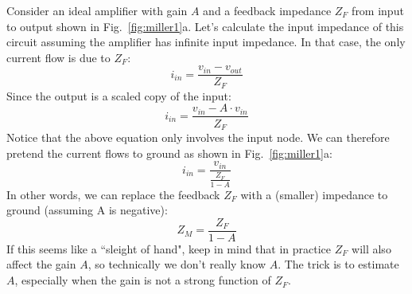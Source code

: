 Consider an ideal amplifier with gain $A$ and a feedback impedance $Z_F$ from input to output shown in Fig.~\ref{fig:miller1}a.  Let's calculate the input impedance of this circuit assuming the amplifier has infinite input impedance.  In that case, the only current flow is due to $Z_F$:
\begin{equation}
	i_{in} = \frac{v_{in} - v_{out}}{Z_F}
\end{equation}
Since the output is a scaled copy of the input:
\begin{equation}
	i_{in} = \frac{ v_{in} - A\cdot v_{in} }{Z_F}
\end{equation}
Notice that the above equation only involves the input node.  We can therefore pretend the current flows to ground as shown in Fig.~\ref{fig:miller1}a:
\begin{equation}
	i_{in} = \frac{v_{in}}{\frac{Z_F}{1 - A}}
\end{equation}
In other words, we can replace the feedback $Z_F$ with a (smaller) impedance to ground (assuming A is negative):
\begin{equation}
	Z_M = \frac{Z_F}{1 - A}
\end{equation}
If this seems like a ``sleight of hand", keep in mind that in practice $Z_F$ will also affect the gain $A$, so technically we don't really know $A$. The trick is to estimate $A$, especially when the gain is not a strong function of $Z_F$.
